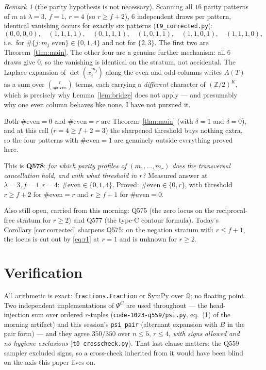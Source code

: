 \documentclass[11pt]{article}
\theoremstyle{definition}
\theoremstyle{remark}
\newtheorem{remark}[theorem]{Remark}
\newcommand{\PsiC}{\Psi^{C}}
\newcommand{\QQ}{\mathbb{Q}}
\newcommand{\ZZ}{\mathbb{Z}}
\begin{document}
\begin{remark}[the parity hypothesis is not necessary]
Scanning all $16$ parity patterns of $m$ at $\lambda=3$, $f=1$, $r=4$ (so $r\ge f+2$),
$6$ independent draws per pattern, identical vanishing occurs for exactly six patterns
(\texttt{t9\_corrected.py}):
\[
  (0,0,0,0),\quad (1,1,1,1),\quad (0,1,1,1),\quad(1,0,1,1),\quad(1,1,0,1),\quad(1,1,1,0),
\]
i.e.\ for $\#\{j:m_j\text{ even}\}\in\{0,1,4\}$ and not for $\{2,3\}$. The first two are
Theorem~\ref{thm:main}. The other four are a genuine further mechanism: all $6$ draws
give $0$, so the vanishing is identical on the stratum, not accidental. The Laplace
expansion of $\det(x_i^{m_j})$ along the even and odd columns writes $A(T)$ as a sum
over $\binom{r}{\#\text{even}}$ terms, each carrying a \emph{different} character of
$(\ZZ/2)^{K}$, which is precisely why Lemma~\ref{lem:bridge} does not apply --- and
presumably why one even column behaves like none. I have not pursued it.
\end{remark}

Both $\#\text{even}=0$ and $\#\text{even}=r$ are Theorem~\ref{thm:main} (with
$\delta=1$ and $\delta=0$), and at this cell ($r=4\ge f+2=3$) the sharpened threshold
buys nothing extra, so the four patterns with $\#\text{even}=1$ are genuinely outside
everything proved here.

This is \textbf{Q578}: \emph{for which parity profiles of $(m_1,\dots,m_r)$ does the
transversal cancellation hold, and with what threshold in $r$?} Measured answer at
$\lambda=3,f=1,r=4$: $\#\text{even}\in\{0,1,4\}$. Proved: $\#\text{even}\in\{0,r\}$,
with threshold $r\ge f+2$ for $\#\text{even}=r$ and $r\ge f+1$ for $\#\text{even}=0$.

Also still open, carried from this morning: Q575 (the zero locus on the reciprocal-free
stratum for $r\ge2$) and Q577 (the type-C contour formula). Today's Corollary
\ref{cor:corrected} sharpens Q575: on the negation stratum with $r\le f+1$, the locus is
cut out by \eqref{eq:r1} at $r=1$ and is unknown for $r\ge2$.

\section{Verification}\label{sec:verif}

All arithmetic is exact: \texttt{fractions.Fraction} or SymPy over $\QQ$; no floating
point. Two independent implementations of $\PsiC$ are used throughout --- the
head-injection sum over ordered $r$-tuples (\texttt{code-1023-q559/psi.py},
eq.~(1) of the morning artifact) and this session's
\texttt{psi\_pair} (alternant expansion with $B$ in the pair form) --- and they agree
$350/350$ over $n\le5$, $r\le4$, \emph{with signs allowed and no hygiene exclusions}
(\texttt{t0\_crosscheck.py}). That last clause matters: the Q559 sampler excluded signs,
so a cross-check inherited from it would have been blind on the axis this paper lives on.
\end{document}
